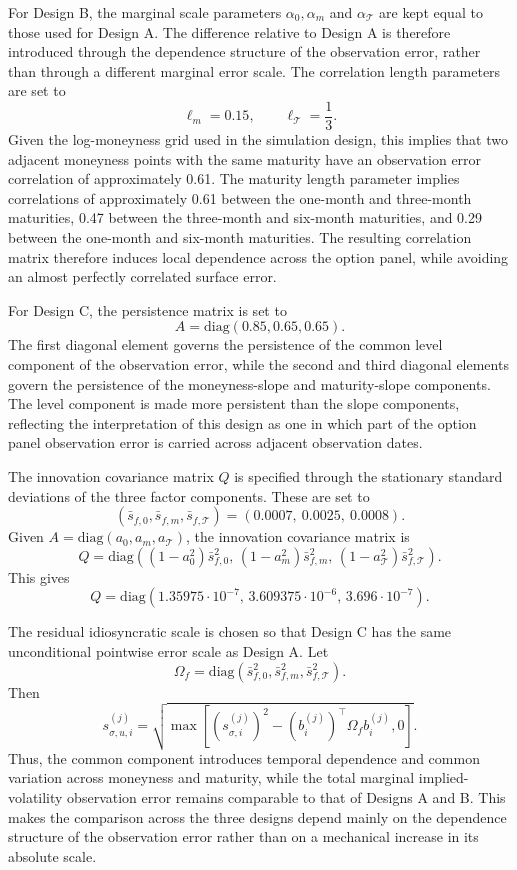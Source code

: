 \documentclass[11pt,a4paper,notitlepage]{article}
\numberwithin{equation}{section}
\begin{document}
For Design B, the marginal scale parameters $\alpha_0, \alpha_m$ and $\alpha_{\mathcal T}$ are kept equal to those used for Design A. The difference relative to Design A is therefore introduced through the dependence structure of the observation error, rather than through a different marginal error scale. The correlation length parameters are set to
\[
\ell_m=0.15,\qquad \ell_{\mathcal T}=\frac{1}{3}.
\]
Given the log-moneyness grid used in the simulation design, this implies that two adjacent moneyness points with the same maturity have an observation error correlation of approximately 0.61. The maturity length parameter implies correlations of approximately 0.61 between the one-month and three-month maturities, 0.47 between the three-month and six-month maturities, and 0.29 between the one-month and six-month maturities. The resulting correlation matrix therefore induces local dependence across the option panel, while avoiding an almost perfectly correlated surface error. 

For Design C, the persistence matrix is set to
\[
A=\mathrm{diag}(0.85,0.65,0.65).
\]
The first diagonal element governs the persistence of the common level component of the observation error, while the second and third diagonal elements govern the persistence of the moneyness-slope and maturity-slope components. The level component is made more persistent than the slope components, reflecting the interpretation of this design as one in which part of the option panel observation error is carried across adjacent observation dates.

The innovation covariance matrix $Q$ is specified through the stationary standard deviations of the three factor components. These are set to
\[
(\bar s_{f,0},\bar s_{f,m},\bar s_{f,\mathcal T})
=
(0.0007,\ 0.0025,\ 0.0008).
\]
Given $A=\mathrm{diag}(a_0,a_m,a_\mathcal T)$, the innovation covariance matrix is
\[
Q
=
\mathrm{diag}
\left(
(1-a_0^2)\bar s_{f,0}^2,\,
(1-a_m^2)\bar s_{f,m}^2,\,
(1-a_\mathcal T^2)\bar s_{f,\mathcal T}^2
\right).
\]
This gives
\[
Q
=
\mathrm{diag}
\left(
1.35975\cdot10^{-7},\,
3.609375\cdot10^{-6},\,
3.696\cdot10^{-7}
\right).
\]

The residual idiosyncratic scale is chosen so that Design C has the same unconditional pointwise error scale as Design A. Let
\[
\Omega_f
=
\mathrm{diag}
\left(
\bar s_{f,0}^2,\bar s_{f,m}^2,\bar s_{f,\mathcal T}^2
\right).
\]
Then
\[
s_{\sigma,u,i}^{(j)}
=
\sqrt{
\max\left[
\left(s_{\sigma,i}^{(j)}\right)^2
-
\left(b_i^{(j)}\right)^\top \Omega_f b_i^{(j)},
0
\right]
}.
\]
Thus, the common component introduces temporal dependence and common variation across moneyness and maturity, while the total marginal implied-volatility observation error remains comparable to that of Designs A and B. This makes the comparison across the three designs depend mainly on the dependence structure of the observation error rather than on a mechanical increase in its absolute scale.
\end{document}
